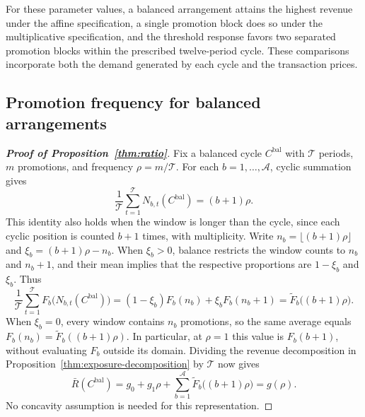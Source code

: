 For these parameter values, a balanced arrangement attains the highest revenue under the affine specification, a single promotion block does so under the multiplicative specification, and the threshold response favors two separated promotion blocks within the prescribed twelve-period cycle. These comparisons incorporate both the demand generated by each cycle and the transaction prices.

\subsection{Promotion frequency for balanced arrangements}

\hypertarget{proof-balanced-frequency}{}

\begin{proof}[\normalfont\bfseries Proof of Proposition~\ref{thm:ratio}]
Fix a balanced cycle \(C^{\mathrm{bal}}\) with \(\mathcal T\) periods, \(m\) promotions, and frequency \(\rho=m/\mathcal T\). For each \(b=1,\ldots,\mathcal A\), cyclic summation gives
\[
 \frac{1}{\mathcal T}\sum_{t=1}^{\mathcal T}N_{b,t}(C^{\mathrm{bal}})
 =(b+1)\rho.
\]
This identity also holds when the window is longer than the cycle, since each cyclic position is counted \(b+1\) times, with multiplicity. Write \(n_b=\lfloor(b+1)\rho\rfloor\) and \(\xi_b=(b+1)\rho-n_b\). When \(\xi_b>0\), balance restricts the window counts to \(n_b\) and \(n_b+1\), and their mean implies that the respective proportions are \(1-\xi_b\) and \(\xi_b\). Thus
\[
 \frac{1}{\mathcal T}\sum_{t=1}^{\mathcal T}
 F_b\bigl(N_{b,t}(C^{\mathrm{bal}})\bigr)
 =(1-\xi_b)F_b(n_b)+\xi_bF_b(n_b+1)
 =\widetilde F_b\bigl((b+1)\rho\bigr).
\]
When \(\xi_b=0\), every window contains \(n_b\) promotions, so the same average equals \(F_b(n_b)=\widetilde F_b((b+1)\rho)\). In particular, at \(\rho=1\) this value is \(F_b(b+1)\), without evaluating \(F_b\) outside its domain. Dividing the revenue decomposition in Proposition~\ref{thm:exposure-decomposition} by \(\mathcal T\) now gives
\[
 \bar R(C^{\mathrm{bal}})
 =g_0+g_1\rho+\sum_{b=1}^{\mathcal A}
 \widetilde F_b\bigl((b+1)\rho\bigr)
 =g(\rho).
\]
No concavity assumption is needed for this representation.
\end{proof}

